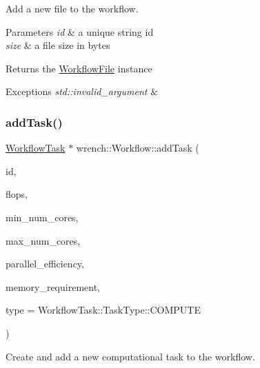 Add a new file to the workflow. 


\begin{DoxyParams}{Parameters}
{\em id} & a unique string id \\
\hline
{\em size} & a file size in bytes\\
\hline
\end{DoxyParams}
\begin{DoxyReturn}{Returns}
the \hyperlink{classwrench_1_1_workflow_file}{Workflow\+File} instance
\end{DoxyReturn}

\begin{DoxyExceptions}{Exceptions}
{\em std\+::invalid\+\_\+argument} & \\
\hline
\end{DoxyExceptions}
\mbox{\label{classwrench_1_1_workflow_aa19c92f95eaf58aed7924adb426d01bf}} 
\subsubsection{\texorpdfstring{add\+Task()}{addTask()}}
{\footnotesize\ttfamily \hyperlink{classwrench_1_1_workflow_task}{Workflow\+Task} $\ast$ wrench\+::\+Workflow\+::add\+Task (\begin{DoxyParamCaption}\item[{std\+::string}]{id,  }\item[{double}]{flops,  }\item[{unsigned long}]{min\+\_\+num\+\_\+cores,  }\item[{unsigned long}]{max\+\_\+num\+\_\+cores,  }\item[{double}]{parallel\+\_\+efficiency,  }\item[{double}]{memory\+\_\+requirement,  }\item[{\hyperlink{classwrench_1_1_workflow_task_a490a935259b9425a3e4fb011a86cb4bf}{Workflow\+Task\+::\+Task\+Type}}]{type = {\ttfamily WorkflowTask\+:\+:TaskType\+:\+:COMPUTE} }\end{DoxyParamCaption})}



Create and add a new computational task to the workflow. 



